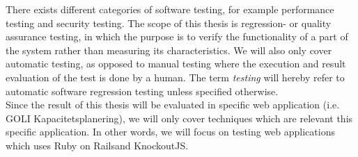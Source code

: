 There exists different categories of software testing, for example
performance testing and security testing. The scope of this thesis is
regression- or quality assurance testing\footnotemark, in which the
purpose is to verify the functionality of a part of the system rather
than measuring its characteristics. We will also only cover automatic
testing, as opposed to manual testing where the execution and result
evaluation of the test is done by a human. The term \emph{testing} will
hereby refer to automatic software regression testing unless specified
otherwise.\\

Since the result of this thesis will be evaluated in specific web
application (i.e. GOLI Kapacitetsplanering), we will only cover
techniques which are relevant this specific application. In other words,
we will focus on testing web applications which uses Ruby on
Rails\footnotemark and KnockoutJS\footnotemark.\\




